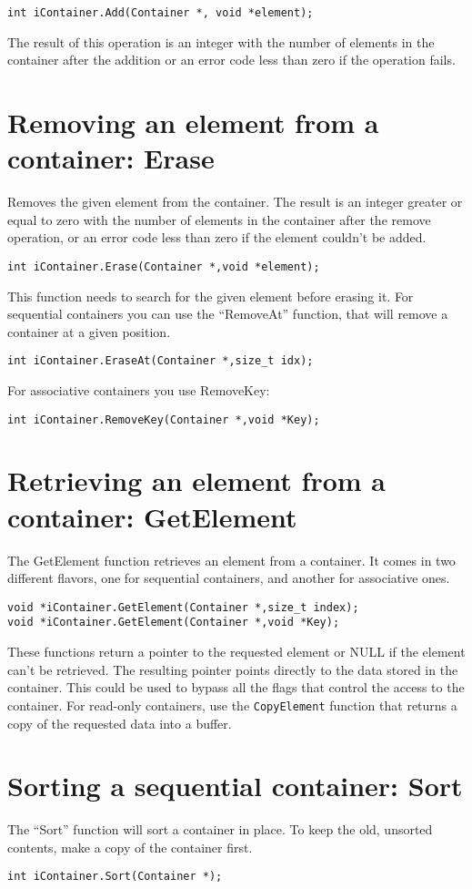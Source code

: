\documentclass[12pt,a4paper]{memoir} %
\newcommand{\Null}{
{\footnotesize NULL}
}
\begin{document}
\texttt{int iContainer.Add(Container *, void *element);}

The result of this operation is an integer with the number of elements in the container after the addition or an error code less than zero if the operation fails.
\section{Removing an element from a container: Erase}
Removes the given element from the container. The result is an integer greater or equal to zero with the number of elements in the container after the remove operation, or an error code less than zero if the element couldn't be added.
\begin{verbatim}
int iContainer.Erase(Container *,void *element);
\end{verbatim}
\noindent This function needs to search for the given element before erasing it. For sequential containers you can use the “RemoveAt” function, that will remove a container at a given position.

\begin{verbatim}
int iContainer.EraseAt(Container *,size_t idx);
\end{verbatim}
\noindent
For associative containers you use RemoveKey:

\begin{verbatim}
int iContainer.RemoveKey(Container *,void *Key);
\end{verbatim}

\section{Retrieving an element from a container: GetElement}
The GetElement function retrieves an element from a container. It comes in two different flavors, one for sequential containers, and another for associative ones.
\begin{verbatim}
void *iContainer.GetElement(Container *,size_t index);
void *iContainer.GetElement(Container *,void *Key);
\end{verbatim}
These functions return a pointer to the requested element or\Null if the element can't be retrieved. The resulting pointer points directly to the data stored in the container. This could be used to bypass all the flags that control the access to the container. For read-only containers, use the \texttt{CopyElement} function that returns a copy of the requested data into a buffer.
\section{Sorting a sequential container: Sort}
The “Sort” function will sort a container in place. To keep the old, unsorted contents, make a copy of the container first.
\begin{verbatim}
int iContainer.Sort(Container *);
\end{verbatim}
\end{document}
